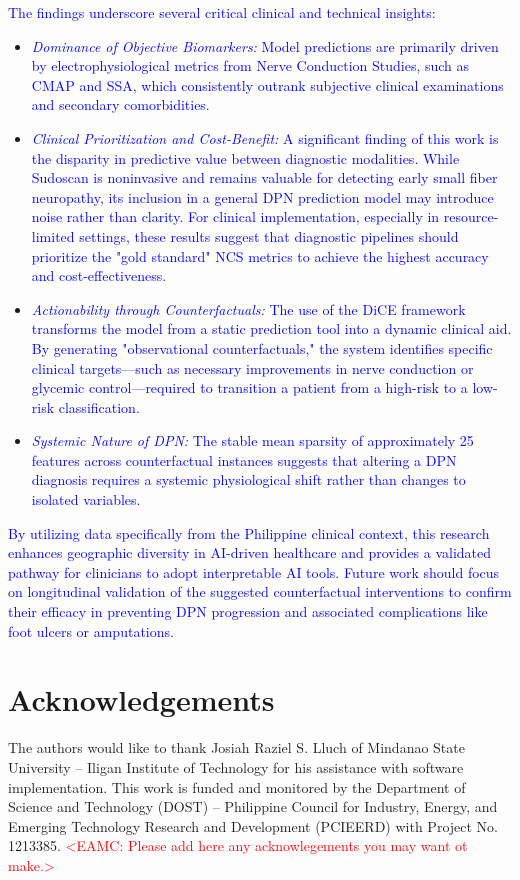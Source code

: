\documentclass[fleqn,10pt]{wlscirep}
\begin{document}
\textcolor{blue}{The findings underscore several critical clinical and technical insights:}
\begin{itemize}
    \item \textcolor{blue}{\textit{Dominance of Objective Biomarkers:} Model predictions are primarily driven by electrophysiological metrics from Nerve Conduction Studies, such as CMAP and SSA, which consistently outrank subjective clinical examinations and secondary comorbidities.}
    \item \textcolor{blue}{\textit{Clinical Prioritization and Cost-Benefit:} A significant finding of this work is the disparity in predictive value between diagnostic modalities. While Sudoscan is noninvasive and remains valuable for detecting early small fiber neuropathy, its inclusion in a general DPN prediction model may introduce noise rather than clarity. For clinical implementation, especially in resource-limited settings, these results suggest that diagnostic pipelines should prioritize the "gold standard" NCS metrics to achieve the highest accuracy and cost-effectiveness.}
    \item \textcolor{blue}{\textit{Actionability through Counterfactuals:} The use of the DiCE framework transforms the model from a static prediction tool into a dynamic clinical aid. By generating "observational counterfactuals," the system identifies specific clinical targets—such as necessary improvements in nerve conduction or glycemic control—required to transition a patient from a high-risk to a low-risk classification.}
    \item \textcolor{blue}{\textit{Systemic Nature of DPN:} The stable mean sparsity of approximately 25 features across counterfactual instances suggests that altering a DPN diagnosis requires a systemic physiological shift rather than changes to isolated variables.}
\end{itemize}

\textcolor{blue}{By utilizing data specifically from the Philippine clinical context, this research enhances geographic diversity in AI-driven healthcare and provides a validated pathway for clinicians to adopt interpretable AI tools. Future work should focus on longitudinal validation of the suggested counterfactual interventions to confirm their efficacy in preventing DPN progression and associated complications like foot ulcers or amputations.}



\section*{Acknowledgements}
The authors would like to thank Josiah Raziel S. Lluch of Mindanao State University – Iligan Institute of Technology for his assistance with software implementation.
This work is funded and monitored by the Department of Science and Technology (DOST) – Philippine Council for Industry, Energy, and Emerging Technology Research and Development (PCIEERD) with Project No. 1213385.
\textcolor{red}{<EAMC: Please add here any acknowlegements you may want ot make.>}
\\
\end{document}
